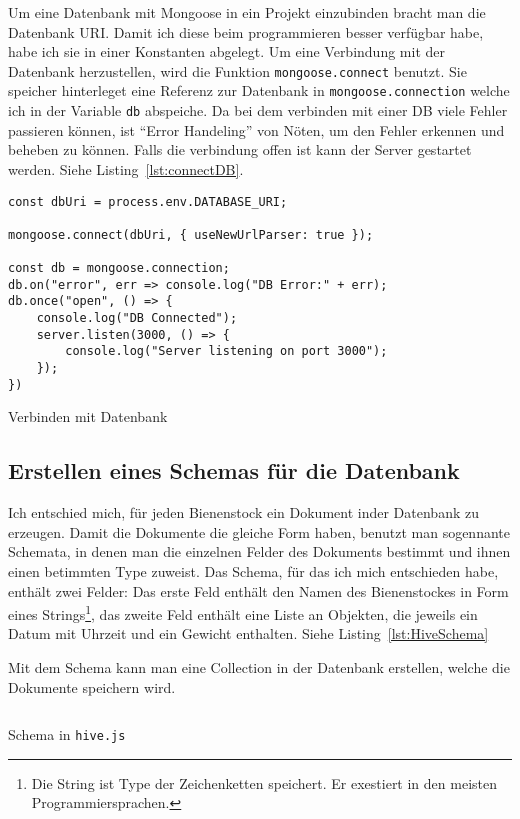 \documentclass[a4paper, ngerman, 12pt]{scrartcl}
\newcommand{\js}[1]{\texttt{#1}}
\begin{document}
Um eine Datenbank mit Mongoose in ein Projekt einzubinden bracht man die Datenbank URI.
Damit ich diese beim programmieren besser verfügbar habe, habe ich sie in einer Konstanten abgelegt.
Um eine Verbindung mit der Datenbank herzustellen, wird die Funktion \js{mongoose.connect} benutzt.
Sie speicher hinterleget eine Referenz zur Datenbank in \js{mongoose.connection} welche ich in der Variable \js{db} abspeiche.
Da bei dem verbinden mit einer DB viele Fehler passieren können, ist \enquote{Error Handeling} von Nöten, um den Fehler erkennen und beheben zu können.
Falls die verbindung offen ist kann der Server gestartet werden. Siehe Listing~\ref{lst:connectDB}.
\begin{listing}[ht]
\centering
\begin{verbatim}
const dbUri = process.env.DATABASE_URI;

mongoose.connect(dbUri, { useNewUrlParser: true });

const db = mongoose.connection;
db.on("error", err => console.log("DB Error:" + err);
db.once("open", () => {
    console.log("DB Connected");
    server.listen(3000, () => {
        console.log("Server listening on port 3000");
    });
})
\end{verbatim}
\caption{Verbinden mit Datenbank\label{lst:connectDB}}
\end{listing}


\subsection{Erstellen eines Schemas für die Datenbank} %

Ich entschied mich, für jeden Bienenstock ein Dokument inder Datenbank zu erzeugen. Damit die Dokumente die gleiche Form haben, benutzt man sogennante Schemata, in denen man die einzelnen Felder des Dokuments bestimmt und ihnen einen betimmten Type zuweist. Das Schema, für das ich mich entschieden habe, enthält zwei Felder: Das erste Feld enthält den Namen des Bienenstockes in Form eines Strings\footnote{Die String ist Type der Zeichenketten speichert. Er exestiert in den meisten Programmiersprachen.}, das zweite Feld enthält eine Liste an Objekten, die jeweils ein Datum mit Uhrzeit und ein Gewicht enthalten. Siehe Listing~\ref{lst:HiveSchema}

Mit dem Schema kann man eine Collection in der Datenbank erstellen, welche die Dokumente speichern wird.

\begin{listing}[ht]
\inputminted{javascript}{../models/hive.js}
\caption{Schema in \texttt{hive.js}}\label{lst:HiveSchema}
\end{listing}
\end{document}
